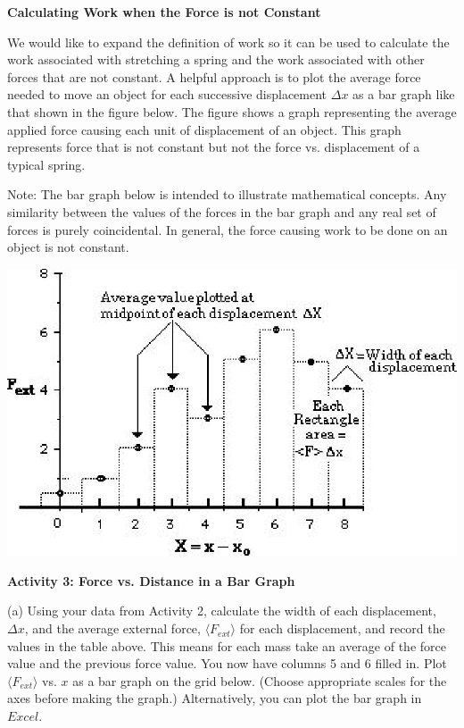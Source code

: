 \textbf{Calculating Work when the Force is not Constant }

We would like to expand the definition of work so it can be used to calculate
the work associated with stretching a spring and the work associated with other
forces that are not constant. A helpful approach is to plot the average force
needed to move an object for each successive displacement \( \Delta  x\) as
a bar graph like that shown in the figure below. The figure shows a graph representing
the average applied force causing each unit of displacement of an object. This
graph represents force that is not constant but not the force vs. displacement
of a typical spring.

Note: The bar graph below is intended to illustrate mathematical concepts. Any
similarity between the values of the forces in the bar graph and any real set
of forces is purely coincidental. In general, the force causing work to be done
on an object is not constant.

\vspace{0.3cm}
{\par\centering \includegraphics{work_kinetic/work_kinetic_fig1.eps} \par}
\vspace{0.3cm}

\textbf{Activity 3: Force vs. Distance in a Bar Graph }

(a) Using your data from Activity 2, calculate the width of each displacement, \( \Delta x \), and the average external force, \(\langle F_{ext} \rangle\) for each displacement, and record the values in the table above. This means for each mass take an average of the force value and the previous force value. You now have columns 5 and 6 filled in. Plot \( \langle F_{ext} \rangle\) vs. $x$ as a bar graph on the grid below.  (Choose appropriate scales for the axes before making the graph.) Alternatively, you can plot the bar graph in $Excel$.

